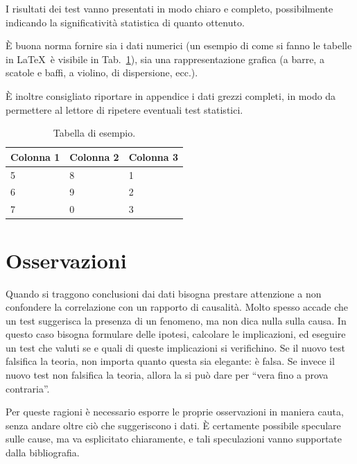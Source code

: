 \documentclass[12pt]{report}
\begin{document}
    I risultati dei test vanno presentati in modo chiaro e completo, possibilmente indicando la significatività statistica di quanto ottenuto.

    \`E buona norma fornire sia i dati numerici (un esempio di come si fanno le tabelle in \LaTeX\  è visibile in Tab.\ \ref{tab:sample}), sia una rappresentazione grafica (a barre, a scatole e baffi, a violino, di dispersione, ecc.).

    \`E inoltre consigliato riportare in appendice i dati grezzi completi, in modo da permettere al lettore di ripetere eventuali test statistici.

    \begin{table}
        \centering
        \begin{tabular}{|l|l|l|}
            \hline
            Colonna 1 & Colonna 2 & Colonna 3 \\ \hline
            5         & 8         & 1         \\
            6         & 9         & 2         \\
            7         & 0         & 3         \\ \hline
        \end{tabular}
        \caption{Tabella di esempio.}
        \label{tab:sample}
    \end{table}


    \section{Osservazioni}

    Quando si traggono conclusioni dai dati bisogna prestare attenzione a non confondere la correlazione con un rapporto di causalità. Molto spesso accade che un test suggerisca la presenza di un fenomeno, ma non dica nulla sulla causa. In questo caso bisogna formulare delle ipotesi, calcolare le implicazioni, ed eseguire un test che valuti se e quali di queste implicazioni si verifichino. Se il nuovo test falsifica la teoria, non importa quanto questa sia elegante: è falsa. Se invece il nuovo test non falsifica la teoria, allora la si può dare per ``vera fino a prova contraria''.

    Per queste ragioni è necessario esporre le proprie osservazioni in maniera cauta, senza andare oltre ciò che suggeriscono i dati. \`E certamente possibile speculare sulle cause, ma va esplicitato chiaramente, e tali speculazioni vanno supportate dalla bibliografia.

%
%
\end{document}

